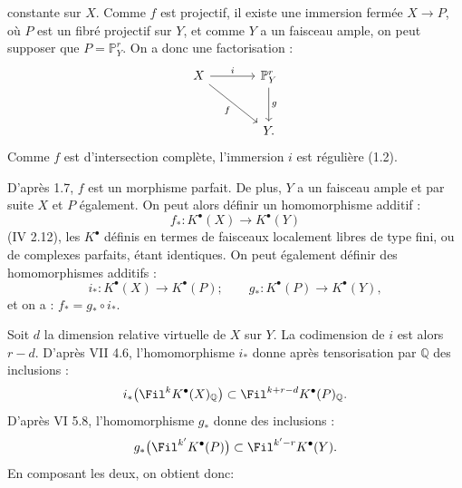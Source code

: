 constante sur $X$. Comme $f$ est projectif, il existe une immersion fermée $X\to P$, où $P$ est un fibré projectif sur $Y$, et comme $Y$ a un faisceau ample, on peut supposer que $P=\mathbb P^r_Y$. On a donc une factorisation :
\[
\begin{tikzcd}[column sep=large,row sep=large]
X \arrow[r,"i"] \arrow[dr,"f"'] & \mathbb P^r_Y \arrow[d,"g"]\\
& Y.
\end{tikzcd}
\]
Comme $f$ est d'intersection complète, l'immersion $i$ est régulière (1.2).

D'après 1.7, $f$ est un morphisme parfait. De plus, $Y$ a un faisceau ample et par suite $X$ et $P$ également. On peut alors définir un homomorphisme additif :
\[
f_*:K^{\bullet}(X)\longrightarrow K^{\bullet}(Y)
\]
(IV 2.12), les $K^{\bullet}$ définis en termes de faisceaux localement libres de type fini, ou de complexes parfaits, étant identiques. On peut également définir des homomorphismes additifs :
\[
i_*:K^{\bullet}(X)\longrightarrow K^{\bullet}(P);
\qquad
 g_*:K^{\bullet}(P)\longrightarrow K^{\bullet}(Y),
\]
et on a : $f_*=g_*\circ i_*$.

Soit $d$ la dimension relative virtuelle de $X$ sur $Y$. La codimension de $i$ est alors $r-d$. D'après VII 4.6, l'homomorphisme $i_*$ donne après tensorisation par $\mathbb Q$ des inclusions :
\[
i_*\bigl(\Fil^kK^{\bullet}(X)_{\mathbb Q}\bigr)
\subset
\Fil^{k+r-d}K^{\bullet}(P)_{\mathbb Q}.
\]
D'après VI 5.8, l'homomorphisme $g_*$ donne des inclusions :
\[
g_*\bigl(\Fil^{k'}K^{\bullet}(P)\bigr)
\subset
\Fil^{k'-r}K^{\bullet}(Y).
\]
En composant les deux, on obtient donc:

